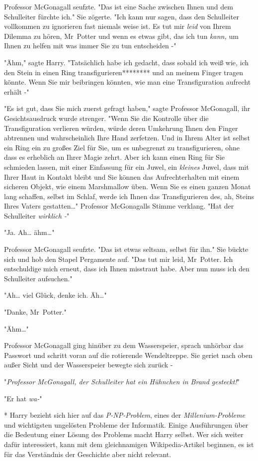 {Professor McGonagall seufzte. "Das ist eine Sache zwischen Ihnen und dem Schulleiter fürchte ich." Sie zögerte. "Ich kann nur sagen, dass den Schulleiter vollkommen zu ignorieren fast niemals weise ist. Es tut mir \emph{leid} von Ihrem Dilemma zu hören, Mr~Potter und wenn es etwas gibt, das ich tun \emph{kann,} um Ihnen zu helfen mit was immer Sie zu tun entscheiden -"

"Ähm," sagte Harry. "Tatsächlich habe ich gedacht, dass sobald ich weiß wie, ich den Stein in einen Ring transfigurieren******** und an meinem Finger tragen könnte. Wenn Sie mir beibringen könnten, wie man eine Transfiguration aufrecht erhält -"

"Es ist gut, dass Sie mich zuerst gefragt haben," sagte Professor McGonagall, ihr Gesichtsausdruck wurde strenger. "Wenn Sie die Kontrolle über die Transfiguration verlieren würden, würde deren Umkehrung Ihnen den Finger abtrennen und wahrscheinlich Ihre Hand zerfetzen. Und in Ihrem Alter ist selbst ein Ring ein zu großes Ziel für Sie, um es unbegrenzt zu transfigurieren, ohne dass es erheblich an Ihrer Magie zehrt. Aber ich kann einen Ring für Sie schmieden lassen, mit einer Einfassung für ein Juwel, ein \emph{kleines} Juwel, dass mit Ihrer Haut in Kontakt bleibt und Sie können das Aufrechterhalten mit einem sicheren Objekt, wie einem Marshmallow üben. Wenn Sie es einen ganzen Monat lang schaffen, selbst im Schlaf, werde ich Ihnen das Transfigurieren des, ah, Steins Ihres Vaters gestatten…" Professor McGonagalls Stimme verklang. "Hat der Schulleiter \emph{wirklich -}"

"Ja. Ah… ähm…"

Professor McGonagall seufzte. "Das ist etwas seltsam, selbst für ihn." Sie bückte sich und hob den Stapel Pergamente auf. "Das tut mir leid, Mr~Potter. Ich entschuldige mich erneut, dass ich Ihnen misstraut habe. Aber nun muss ich den Schulleiter aufsuchen."

"Ah… viel Glück, denke ich. Äh…"

"Danke, Mr~Potter."

"Ähm…"

Professor McGonagall ging hinüber zu dem Wasserspeier, sprach unhörbar das Passwort und schritt voran auf die rotierende Wendeltreppe. Sie geriet nach oben außer Sicht und der Wasserspeier bewegte sich zurück -

"\emph{Professor McGonagall, der Schulleiter hat ein Hühnchen in Brand gesteckt!}"

"Er hat \emph{wa-}"

* Harry bezieht sich hier auf das \emph{P-NP-Problem}, eines der \emph{Millenium-Probleme} und wichtigsten ungelösten Probleme der Informatik. Einige Ausführungen über die Bedeutung einer Lösung des Problems macht Harry selbst. Wer sich weiter dafür interessiert, kann mit dem gleichnamigen Wikipedia-Artikel beginnen, es ist für das Verständnis der Geschichte aber nicht relevant.

}

